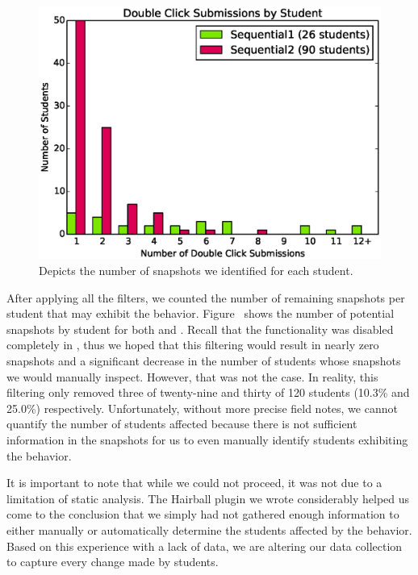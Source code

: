 \begin{figure}[!t]
\centering \includegraphics[width=5.25in]{graphs/dc_submissions.eps}
\caption{Depicts the number of \dce{} snapshots we identified for each
  student.}
\end{figure}

After applying all the filters, we counted the number of remaining snapshots
per student that may exhibit the \dce{}
behavior. Figure~ shows the number of potential
snapshots by student for both \sone{} and \stwo{}. Recall that the \dce{}
functionality was disabled completely in \stwo{}, thus we hoped that this
filtering would result in nearly zero \stwo{} snapshots and a significant
decrease in the number of \sone{} students whose snapshots we would manually
inspect. However, that was not the case. In reality, this filtering only
removed three of twenty-nine and thirty of 120 students (10.3\% and 25.0\%)
respectively. Unfortunately, without more precise field notes, we cannot
quantify the number of students affected because there is not sufficient
information in the snapshots for us to even manually identify students
exhibiting the \dce{} behavior.

It is important to note that while we could not proceed, it was not due to a
limitation of static analysis. The Hairball plugin we wrote considerably helped
us come to the conclusion that we simply had not gathered enough information to
either manually or automatically determine the students affected by the \dce{}
behavior. Based on this experience with a lack of data, we are altering our
data collection to capture every change made by students.
